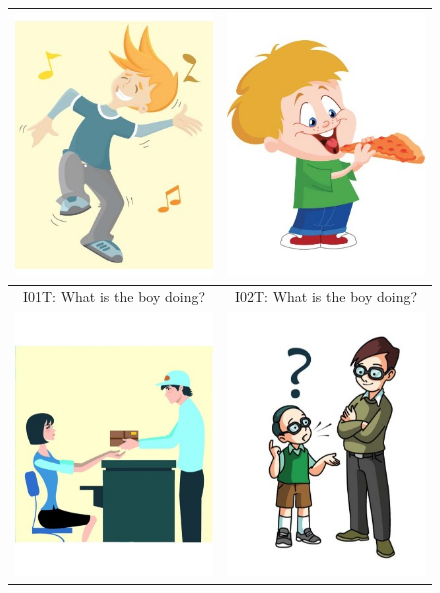 \documentclass[12pt]{article}
\begin{document}
\begin{figure}[h]
\begin{center}
\begin{tabular}{|c|c|}
\hline
\includegraphics[width=0.35\columnwidth,trim=0 0 0 -3]{figures/I01.jpg} & \includegraphics[width=0.35\columnwidth,trim=0 0 0 -3]{figures/I02.jpg}\\
\hline
I01T: What is the boy doing? & I02T: What is the boy doing? \\
\hline
\hline
\includegraphics[width=0.35\columnwidth,trim=0 0 0 -3]{figures/I03.jpg} & \includegraphics[width=0.35\columnwidth,trim=0 0 0 -3]{figures/I11.jpg}\\

\end{tabular}
\end{center}
\end{figure}
\end{document}
